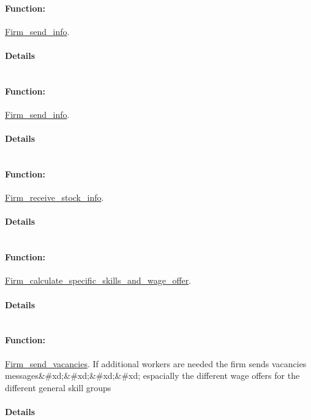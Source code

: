 \documentclass[a4paper,11pt]{article}
\begin{document}
\paragraph{Function:}\url{Firm_send_info}.

\paragraph{Details}
\begin{verbatim}
\end{verbatim}
\paragraph{Function:}\url{Firm_send_info}.

\paragraph{Details}
\begin{verbatim}
\end{verbatim}
\paragraph{Function:}\url{Firm_receive_stock_info}.

\paragraph{Details}
\begin{verbatim}
\end{verbatim}
\paragraph{Function:}\url{Firm_calculate_specific_skills_and_wage_offer}.

\paragraph{Details}
\begin{verbatim}
\end{verbatim}
\paragraph{Function:}\url{Firm_send_vacancies}.
If additional workers are needed the firm sends vacancies messages\&\#xd;\&\#xd;\&\#xd;\&\#xd;
 espacially the different wage offers for the different general skill groups
\paragraph{Details}
\begin{verbatim}
\end{verbatim}
\end{document}

